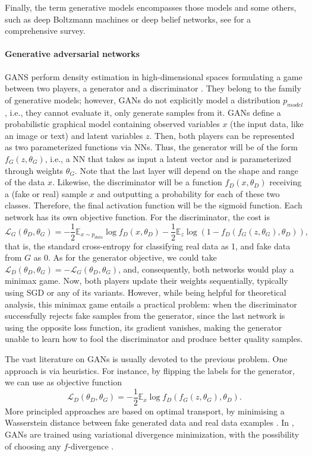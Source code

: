 Finally, the term generative models 
encompasses those models and some others, such as deep Boltzmann machines or deep belief networks, see \cite{doi:10.1146/annurev-statistics-010814-020120} for a comprehensive survey.

\paragraph{Generative adversarial networks} GANS  perform density estimation in high-dimensional spaces formulating a game between two players, a generator and a discriminator \cite{goodfellow2014generative}. They belong to the family of generative models; however, GANs do not explicitly model a distribution $p_{model}$, i.e., they cannot evaluate it, only generate samples from it.
GANs define a probabilistic graphical model containing observed variables $x$ (the input data, like an image or text) and latent variables $z$. Then, both players can be represented as two parameterized functions via NNs. Thus, the generator will be of the form $f_G(z, \theta_G)$, i.e., a NN that takes as input a latent vector and is parameterized through weights $\theta_G$. Note that the last layer will depend on the shape and range of the data $x$. Likewise, the discriminator will be a function $f_D(x, \theta_D)$ receiving a (fake or real) sample $x$ and outputting a probability for each of these two classes. Therefore, the final activation function will be 
the sigmoid function. Each network has its own objective function. For the discriminator, the cost is
$$
\mathcal{L}_G(\theta_D, \theta_G) = -\dfrac{1}{2} \mathbb{E}_{x \sim p_{data}} \log f_D(x, \theta_D) -\dfrac{1}{2} \mathbb{E}_z \log (1 - f_D(f_G(z, \theta_G), \theta_D)),
$$
that is, the standard cross-entropy for classifying real data as 1, and fake data from $G$ as 0. As for the generator objective, we could take $\mathcal{L}_D(\theta_D, \theta_G) = -\mathcal{L}_G(\theta_D, \theta_G)$,
and, consequently, both networks would play a minimax game.
Now, both players update their weights sequentially, typically using SGD or any of its variants.
However, while being helpful for theoretical analysis, 
this minimax game entails a practical problem: when the discriminator successfully rejects fake samples from the generator, since the last network is using the opposite loss function, its gradient vanishes, making the generator unable to learn how to fool the discriminator and produce better quality samples.

The vast literature on GANs is usually devoted to the previous problem. One approach is via heuristics. For instance, by flipping the labels for the generator, we can use as objective function
$$
\mathcal{L}_D(\theta_D, \theta_G) = -\dfrac{1}{2} \mathbb{E}_{x} \log f_D(f_G(z, \theta_G), \theta_D).
$$
More principled approaches are based on optimal transport, by minimising a Wasserstein distance between fake generated data and real data examples \cite{arjovsky2017wasserstein}. In \cite{nowozin2016f}, GANs are trained using variational divergence minimization, with the possibility of choosing any $f$-divergence \cite{CIT-004}.

